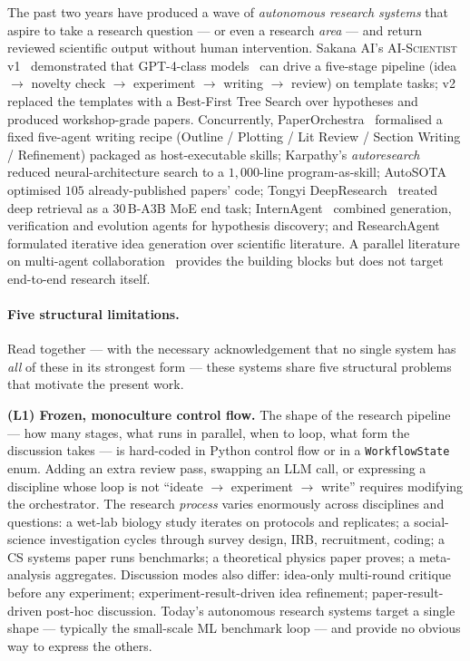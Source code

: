 \documentclass{article}
\newcommand{\code}[1]{\texttt{\small #1}}
\begin{document}
The past two years have produced a wave of \emph{autonomous research
systems} that aspire to take a research question --- or even a research
\emph{area} --- and return reviewed scientific output without human
intervention. Sakana AI's \textsc{AI-Scientist} v1~\cite{aisciv1}
demonstrated that GPT-4-class models~\cite{gpt4} can drive a five-stage
pipeline (idea $\rightarrow$ novelty check $\rightarrow$ experiment
$\rightarrow$ writing $\rightarrow$ review) on template tasks; v2~\cite{aisciv2}
replaced the templates with a Best-First Tree Search over hypotheses and
produced workshop-grade papers. Concurrently, PaperOrchestra~\cite{paperorchestra}
formalised a fixed five-agent writing recipe (Outline / Plotting / Lit
Review / Section Writing / Refinement) packaged as host-executable skills;
Karpathy's \emph{autoresearch} reduced neural-architecture search to a
$1{,}000$-line program-as-skill; AutoSOTA~\cite{autosota} optimised
$105$ already-published papers' code; Tongyi DeepResearch~\cite{deepresearch}
treated deep retrieval as a $30$\,B-A3B MoE end task;
InternAgent~\cite{internagent} combined generation, verification and
evolution agents for hypothesis discovery; and
ResearchAgent~\cite{researchagent} formulated iterative idea generation
over scientific literature. A parallel literature on multi-agent
collaboration~\cite{metagpt,autogen,reflexion,react} provides the building
blocks but does not target end-to-end research itself.

\paragraph{Five structural limitations.}
Read together --- with the necessary acknowledgement that no single
system has \emph{all} of these in its strongest form --- these systems
share five structural problems that motivate the present work.

\textbf{(L1) Frozen, monoculture control flow.} The shape of the research
pipeline --- how many stages, what runs in parallel, when to loop, what
form the discussion takes --- is hard-coded in Python control flow or in
a \code{WorkflowState} enum. Adding an extra review pass, swapping an LLM
call, or expressing a discipline whose loop is not ``ideate $\to$
experiment $\to$ write'' requires modifying the orchestrator. The
research \emph{process} varies enormously across disciplines and
questions: a wet-lab biology study iterates on protocols and replicates;
a social-science investigation cycles through survey design, IRB,
recruitment, coding; a CS systems paper runs benchmarks; a theoretical
physics paper proves; a meta-analysis aggregates. Discussion modes also
differ: idea-only multi-round critique before any experiment;
experiment-result-driven idea refinement; paper-result-driven post-hoc
discussion. Today's autonomous research systems target a single shape
--- typically the small-scale ML benchmark loop --- and provide no
obvious way to express the others.
\end{document}
